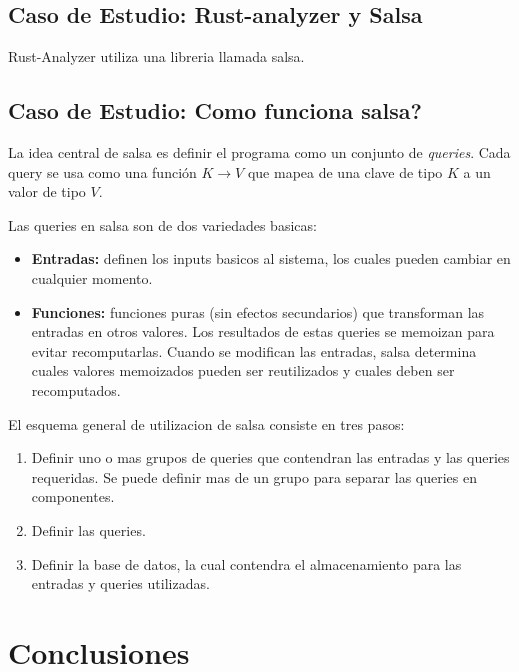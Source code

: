 \documentclass[12pt, a4paper]{report}
\begin{document}
\subsection*{Caso de Estudio: Rust-analyzer y Salsa}

Rust-Analyzer utiliza una libreria llamada salsa.

\subsection*{Caso de Estudio: Como funciona salsa?}

La idea central de salsa es definir el programa como un conjunto de \textit{queries}.
Cada query se usa como una función $K \to V$ que mapea de una clave de tipo $K$ a un valor de tipo $V$.

Las queries en salsa son de dos variedades basicas:
\begin{itemize}[noitemsep]
\item \textbf{Entradas:}
definen los inputs basicos al sistema, los cuales pueden cambiar en cualquier momento.
\item \textbf{Funciones:}
funciones puras (sin efectos secundarios) que transforman las entradas en otros valores.
Los resultados de estas queries se memoizan para evitar recomputarlas.
Cuando se modifican las entradas, salsa determina cuales valores memoizados pueden ser reutilizados y cuales deben ser recomputados.
\end{itemize}

El esquema general de utilizacion de salsa consiste en tres pasos:

\begin{enumerate}[noitemsep]
\item Definir uno o mas grupos de queries que contendran las entradas y las queries requeridas.
Se puede definir mas de un grupo para separar las queries en componentes.
\item Definir las queries.
\item Definir la base de datos, la cual contendra el almacenamiento para las entradas y queries utilizadas.
\end{enumerate}

\section*{Conclusiones}
\end{document}
